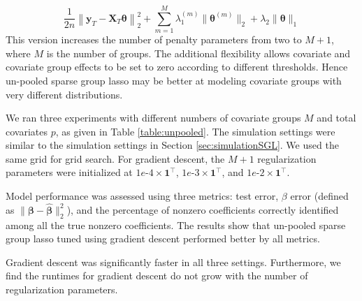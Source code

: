 \documentclass[12pt,letterpaper]{article}
\begin{document}
\begin{equation}
\frac{1}{2n} 
\left \| \boldsymbol{y}_T - \boldsymbol{X}_T \boldsymbol{\theta} \right \|^2_2
+ \sum_{m=1}^M \lambda_1^{(m)} \| \boldsymbol \theta^{(m)} \|_2
+ \lambda_2 \| \boldsymbol \theta \|_1
\label{unpooledSGL}
\end{equation}
This version increases the number of penalty parameters from two to $M+1$, where $M$ is the number of groups. The additional flexibility allows covariate and covariate group effects to be set to zero according to different thresholds. Hence un-pooled sparse group lasso may be better at modeling covariate groups with very different distributions.

We ran three experiments with different numbers of covariate groups $M$ and total covariates $p$, as given in Table \ref{table:unpooled}. The simulation settings were similar to the simulation settings in Section \ref{sec:simulationSGL}. We used the same grid for grid search. For gradient descent, the $M+1$ regularization parameters were initialized at $1e\text{-}4 \times \boldsymbol 1^\top$, $1e\text{-}3 \times \boldsymbol 1^\top$, and $1e\text{-}2 \times \boldsymbol 1^\top$.

Model performance was assessed using three metrics: test error, $\beta$ error (defined as $\| \boldsymbol \beta - \hat {\boldsymbol \beta} \|_2 ^2$), and the percentage of nonzero coefficients correctly identified among all the true nonzero coefficients. The results show that un-pooled sparse group lasso tuned using gradient descent performed better by all metrics.

Gradient descent was significantly faster in all three settings. Furthermore, we find the runtimes for gradient descent do not grow with the number of regularization parameters.
\end{document}
